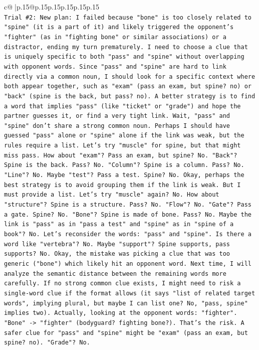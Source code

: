 \documentclass{article}
\begin{document}
{\begin{supertabular}{c@{$\;$}|p{.15\linewidth}@{}p{.15\linewidth}p{.15\linewidth}p{.15\linewidth}p{.15\linewidth}p{.15\linewidth}}
{{{\\ 
\texttt{Trial \#2: New plan: I failed because "bone" is too closely related to "spine" (it is a part of it) and likely triggered the opponent's "fighter" (as in "fighting bone" or similar associations) or a distractor, ending my turn prematurely. I need to choose a clue that is uniquely specific to both "pass" and "spine" without overlapping with opponent words. Since "pass" and "spine" are hard to link directly via a common noun, I should look for a specific context where both appear together, such as "exam" (pass an exam, but spine? no) or "back" (spine is the back, but pass? no). A better strategy is to find a word that implies "pass" (like "ticket" or "grade") and hope the partner guesses it, or find a very tight link. Wait, "pass" and "spine" don't share a strong common noun. Perhaps I should have guessed "pass" alone or "spine" alone if the link was weak, but the rules require a list. Let's try "muscle" for spine, but that might miss pass. How about "exam"? Pass an exam, but spine? No. "Back"? Spine is the back. Pass? No. "Column"? Spine is a column. Pass? No. "Line"? No. Maybe "test"? Pass a test. Spine? No. Okay, perhaps the best strategy is to avoid grouping them if the link is weak. But I must provide a list. Let's try "muscle" again? No. How about "structure"? Spine is a structure. Pass? No. "Flow"? No. "Gate"? Pass a gate. Spine? No. "Bone"? Spine is made of bone. Pass? No. Maybe the link is "pass" as in "pass a test" and "spine" as in "spine of a book"? No. Let's reconsider the words: "pass" and "spine". Is there a word like "vertebra"? No. Maybe "support"? Spine supports, pass supports? No. Okay, the mistake was picking a clue that was too generic ("bone") which likely hit an opponent word. Next time, I will analyze the semantic distance between the remaining words more carefully. If no strong common clue exists, I might need to risk a single{-}word clue if the format allows (it says "list of related target words", implying plural, but maybe I can list one? No, "pass, spine" implies two). Actually, looking at the opponent words: "fighter". "Bone" {-}> "fighter" (bodyguard? fighting bone?). That's the risk. A safer clue for "pass" and "spine" might be "exam" (pass an exam, but spine? no). "Grade"? No.} \\
\\ 
}}}
\end{supertabular}}
\end{document}
